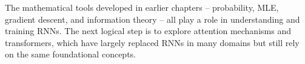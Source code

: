 \documentclass{tufte-handout}
\begin{document}
The mathematical tools developed in earlier chapters – probability, MLE, gradient descent, and information theory – all play a role in understanding and training RNNs. The next logical step is to explore attention mechanisms and transformers, which have largely replaced RNNs in many domains but still rely on the same foundational concepts.
\end{document}
